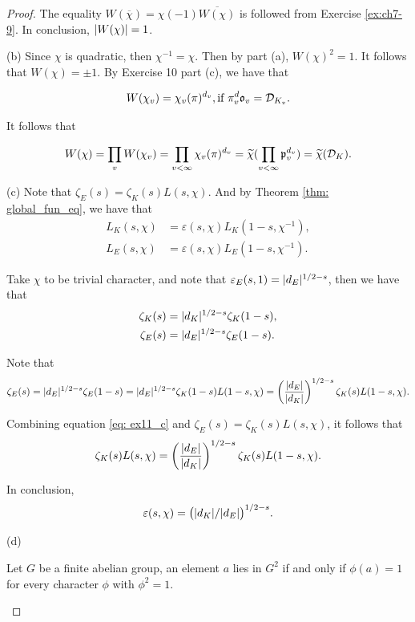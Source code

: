 \begin{proof}
  The equality $W(\overline{\chi}) = \chi(-1) \overline{W(\chi)}$ is followed from Exercise
  \ref{ex:ch7-9}.
  In conclusion, $\lvert W(\chi)\rvert = 1$.

  (b) Since $\chi$ is quadratic, then $\chi^{-1} = \chi$. Then by part (a), $W(\chi) ^ 2 = 1$.
  It follows that $W(\chi) = \pm 1$. By Exercise 10 part (c), we have that

  \[W(\chi_v) = \chi_v (\pi)^ {d_v}, \text{if } \pi^d_v \mathfrak{o}_v = \mathcal{D}_{K_v}.  \]

  It follows that

  \[W(\chi) = \prod_{v} W(\chi_v) = \prod_{v< \infty} \chi_v (\pi) ^{d_v}
  =  \widetilde{\chi} ( \prod_{v < \infty} \mathfrak{p}_v ^ {d_v}) =
   \widetilde{\chi} (\mathcal{D}_K). \]

   (c) Note that $\zeta_E (s) = \zeta_K(s) L(s, \chi)$.
   And by Theorem \ref{thm: global_fun_eq}, we have that
   \begin{align}
    L_K(s, \chi) &= \varepsilon(s, \chi) L_K(1-s, \chi^{-1}), \\
    L_E(s, \chi) &= \varepsilon(s, \chi) L_E(1-s, \chi^{-1}).
   \end{align}

   Take $\chi $ to be trivial character, and note that $\varepsilon_E(s, 1) = \lvert d_E\rvert^{1/2 -s}$,
   then we have that
   \begin{align}
    \zeta_K(s) & = \lvert d_K\rvert^{1/2-s} \zeta_K(1-s), \\
    \zeta_E(s) & = \lvert d_E\rvert^{1/2-s} \zeta_E(1-s).
   \end{align}

   Note that
   \begin{equation}
    \zeta_E(s) = \lvert d_E\rvert^{1/2-s} \zeta_E(1-s) = \lvert d_E\rvert^{1/2-s} \zeta_K(1-s) L(1-s, \chi) =
    \left(\frac{\lvert d_E\rvert}{\lvert d_K\rvert}\right)^{1/2-s} \zeta_K(s) L(1-s, \chi).
    \label{eq: ex11_c}
   \end{equation}

   Combining equation \eqref{eq: ex11_c} and $\zeta_E(s)= \zeta_K(s) L(s, \chi)$, it follows that
   \[\zeta_K(s) L(s, \chi) = \left(\frac{\lvert d_E\rvert}{\lvert d_K\rvert}\right)^{1/2-s} \zeta_K(s) L(1-s, \chi). \]

   In conclusion,
   \[ \varepsilon(s, \chi) = \bigl(\lvert d_K\rvert /\lvert d_E\rvert\bigr)^{1/2-s}. \]

   (d)
   \begin{lemma}
    Let $G$ be a finite abelian group, an element $a$ lies in $G^2$ if and only if $\phi(a)=1$
    for every character $\phi$ with $\phi^2=1$.
   \end{lemma}


\end{proof}
